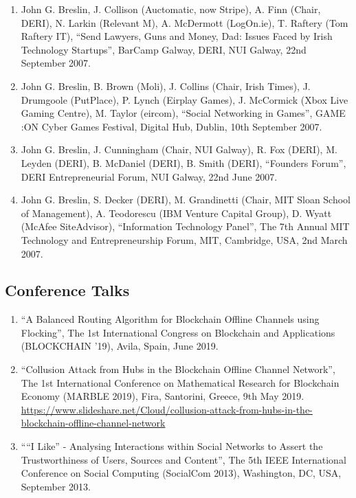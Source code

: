 \documentclass[10pt,a4paper]{res} %
\begin{document}
\begin{resume}
\begin{enumerate}
\item John G. Breslin, J. Collison (Auctomatic, now Stripe), A. Finn (Chair, DERI), N. Larkin (Relevant M), A. McDermott (LogOn.ie), T. Raftery (Tom Raftery IT), ``Send Lawyers, Guns and Money, Dad: Issues Faced by Irish Technology Startups'', BarCamp Galway, DERI, NUI Galway, 22nd September 2007.
\item John G. Breslin, B. Brown (Moli), J. Collins (Chair, Irish Times), J. Drumgoole (PutPlace), P. Lynch (Eirplay Games), J. McCormick (Xbox Live Gaming Centre), M. Taylor (eircom), ``Social Networking in Games'', GAME :ON Cyber Games Festival, Digital Hub, Dublin, 10th September 2007.
\item John G. Breslin, J. Cunningham (Chair, NUI Galway), R. Fox (DERI), M. Leyden (DERI), B. McDaniel (DERI), B. Smith (DERI), ``Founders Forum'', DERI Entrepreneurial Forum, NUI Galway, 22nd June 2007.
\item John G. Breslin, S. Decker (DERI), M. Grandinetti (Chair, MIT Sloan School of Management), A. Teodorescu (IBM Venture Capital Group), D. Wyatt (McAfee SiteAdvisor), ``Information Technology Panel'', The 7th Annual MIT Technology and Entrepreneurship Forum, MIT, Cambridge, USA, 2nd March 2007.
\end{enumerate}

\subsection*{Conference Talks}

\begin{enumerate} \itemsep -2pt
\item ``A Balanced Routing Algorithm for Blockchain Offline Channels using Flocking'', The 1st International Congress on Blockchain and Applications (BLOCKCHAIN '19), Avila, Spain, June 2019.
\item ``Collusion Attack from Hubs in the Blockchain Offline Channel Network'', The 1st International Conference on Mathematical Research for Blockchain Economy (MARBLE 2019), Fira, Santorini, Greece, 9th May 2019. \url{https://www.slideshare.net/Cloud/collusion-attack-from-hubs-in-the-blockchain-offline-channel-network}
\item ````I Like'' - Analysing Interactions within Social Networks to Assert the Trustworthiness of Users, Sources and Content'', The 5th IEEE International Conference on Social Computing (SocialCom 2013), Washington, DC, USA, September 2013.
\end{enumerate}
 

\end{resume}
\end{document}
